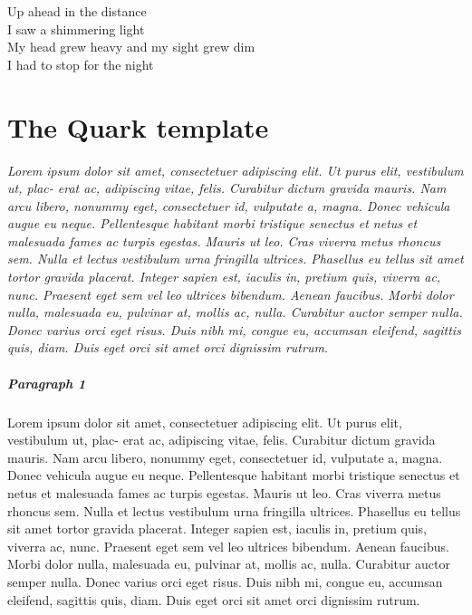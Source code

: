 \begin{savequote}[120mm]
Up ahead in the distance \\
I saw a shimmering light \\
My head grew heavy and my sight grew dim \\
I had to stop for the night
\end{savequote}


\chapter{The Quark template}
\label{chapter1}
\thispagestyle{fancy}

\textit{Lorem ipsum dolor sit amet, consectetuer adipiscing elit. Ut purus elit, vestibulum ut, plac- erat ac, adipiscing vitae, felis. Curabitur dictum gravida mauris. Nam arcu libero, nonummy eget, consectetuer id, vulputate a, magna. Donec vehicula augue eu neque. Pellentesque habitant morbi tristique senectus et netus et malesuada fames ac turpis egestas. Mauris ut leo. Cras viverra metus rhoncus sem. Nulla et lectus vestibulum urna fringilla ultrices. Phasellus eu tellus sit amet tortor gravida placerat. Integer sapien est, iaculis in, pretium quis, viverra ac, nunc. Praesent eget sem vel leo ultrices bibendum. Aenean faucibus. Morbi dolor nulla, malesuada eu, pulvinar at, mollis ac, nulla. Curabitur auctor semper nulla. Donec varius orci eget risus. Duis nibh mi, congue eu, accumsan eleifend, sagittis quis, diam. Duis eget orci sit amet orci dignissim rutrum.}


\paragraph{Paragraph 1}

Lorem ipsum dolor sit amet, consectetuer adipiscing elit. Ut purus elit, vestibulum ut, plac- erat ac, adipiscing vitae, felis. Curabitur dictum gravida mauris. Nam arcu libero, nonummy eget, consectetuer id, vulputate a, magna. Donec vehicula augue eu neque. Pellentesque habitant morbi tristique senectus et netus et malesuada fames ac turpis egestas. Mauris ut leo. Cras viverra metus rhoncus sem. Nulla et lectus vestibulum urna fringilla ultrices. Phasellus eu tellus sit amet tortor gravida placerat. Integer sapien est, iaculis in, pretium quis, viverra ac, nunc. Praesent eget sem vel leo ultrices bibendum. Aenean faucibus. Morbi dolor nulla, malesuada eu, pulvinar at, mollis ac, nulla. Curabitur auctor semper nulla. Donec varius orci eget risus. Duis nibh mi, congue eu, accumsan eleifend, sagittis quis, diam. Duis eget orci sit amet orci dignissim rutrum.



